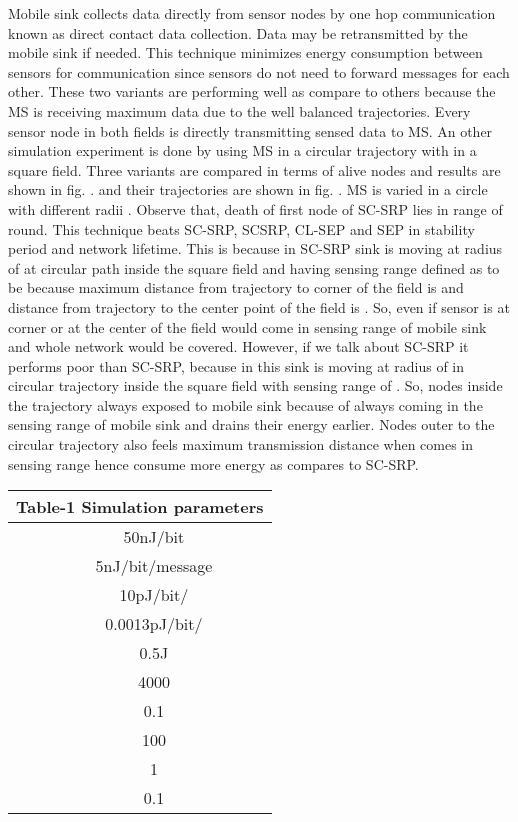 \documentclass{article}
\begin{document}
Mobile sink collects data directly from sensor nodes by one hop communication known as direct contact data collection. Data may be retransmitted by the mobile sink if needed. This technique minimizes energy consumption between sensors for communication since sensors do not need to forward messages for each other. These two variants are performing well as compare to others because the MS is receiving maximum data due to the well balanced trajectories. Every sensor node in both fields is directly transmitting sensed data to MS. An other simulation experiment is done by using MS in a circular trajectory with in a square field. Three variants are compared in terms of alive nodes and results are shown in fig. . and their trajectories are shown in fig. . MS is varied in a circle with  different radii . Observe that, death of first node of SC-SRP lies in range of  round. This technique beats SC-SRP, SCSRP, CL-SEP and SEP in stability period and network lifetime. This is because in SC-SRP sink is moving at radius of  at circular path inside the square field and having sensing range defined as to be  because maximum distance from trajectory to corner of the field is  and distance from trajectory to the center point of the field is . So, even if sensor is at corner or at the center of the field would come in sensing range of mobile sink and whole network would be covered. However, if we talk about SC-SRP it performs poor than SC-SRP, because in this sink is moving at radius of  in circular trajectory inside the square field with sensing range of . So, nodes inside the trajectory always exposed to mobile sink because of always coming in the sensing range of mobile sink and drains their energy earlier. Nodes outer to the circular trajectory also feels maximum transmission distance when comes in sensing range hence consume more energy as compares to SC-SRP.

\begin{table}[ht]
\centering
\begin{tabular}{|c |c |} \multicolumn{2}{c}{Table-1 Simulation parameters}\\
\hline
 & 50nJ/bit\\
\hline                   & 5nJ/bit/message  \\
\hline
& 10pJ/bit/  \\
\hline
 & 0.0013pJ/bit/    \\
\hline
  & 0.5J \\
 \hline
  & 4000 \\
 \hline
  & 0.1 \\
\hline
  & 100\\
 \hline
  & 1 \\
 \hline
  & 0.1 \\
\hline
\end{tabular}
\end{table}
\end{document}
